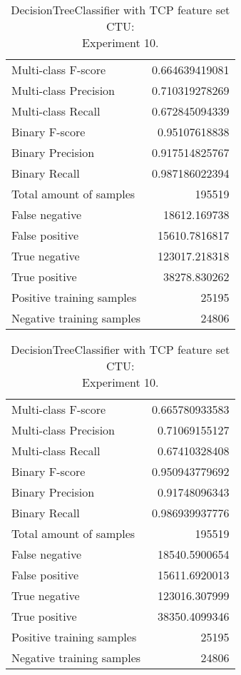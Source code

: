 \begin{table}[H]
\begin{minipage}{0.5\textwidth}
\caption{DecisionTreeClassifier with TCP feature set CTU: \\Experiment 9.}
\centering
\begin{tabular}{l r}
\toprule
Multi-class F-score & 0.664639419081 \\
Multi-class Precision & 0.710319278269 \\
Multi-class Recall & 0.672845094339 \\
\midrule
Binary F-score & 0.95107618838 \\
Binary Precision & 0.917514825767 \\
Binary Recall & 0.987186022394 \\
\midrule
Total amount of samples & 195519 \\
False negative & 18612.169738 \\
False positive & 15610.7816817 \\
True negative & 123017.218318 \\
True positive & 38278.830262 \\
\midrule
Positive training samples & 25195 \\
Negative training samples & 24806 \\
\bottomrule
\end{tabular}
\end{minipage}
\hfillx
\begin{minipage}{0.5\textwidth}
\caption{DecisionTreeClassifier with TCP feature set CTU: \\Experiment 10.}
\centering
\begin{tabular}{l r}
\toprule
Multi-class F-score & 0.665780933583 \\
Multi-class Precision & 0.71069155127 \\
Multi-class Recall & 0.67410328408 \\
\midrule
Binary F-score & 0.950943779692 \\
Binary Precision & 0.91748096343 \\
Binary Recall & 0.986939937776 \\
\midrule
Total amount of samples & 195519 \\
False negative & 18540.5900654 \\
False positive & 15611.6920013 \\
True negative & 123016.307999 \\
True positive & 38350.4099346 \\
\midrule
Positive training samples & 25195 \\
Negative training samples & 24806 \\
\bottomrule
\end{tabular}
\end{minipage}
\end{table}

